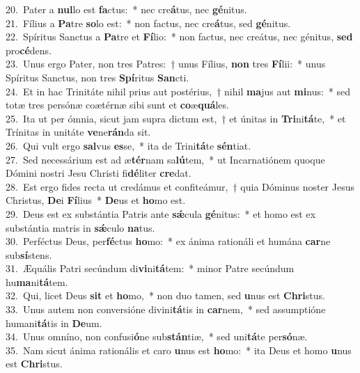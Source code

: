 {20.~}Pater a \textbf{nul}lo est \textbf{fa}ctus:~* nec cre\textbf{á}tus, nec \textbf{gé}nitus.\\
{21.~}Fílius a \textbf{Pa}tre \textbf{so}lo est:~* non factus, nec cre\textbf{á}tus, sed \textbf{gé}nitus.\\
{22.~}Spíritus Sanctus a \textbf{Pa}tre et \textbf{Fí}lio:~* non factus, nec creátus, nec génitus, \textbf{sed} pro\textbf{cé}dens.\\
{23.~}Unus ergo Pater, non tres Patres:~† unus Fílius, \textbf{non} tres \textbf{Fí}lii:~* unus Spíritus Sanctus, non tres \textbf{Spí}ritus \textbf{San}cti.\\
{24.~}Et in hac Trinitáte nihil prius aut postérius,~† nihil \textbf{ma}jus aut \textbf{mi}nus:~* sed totæ tres persónæ coætérnæ sibi sunt et \textbf{co}æ\textbf{quá}les.\\
{25.~}Ita ut per ómnia, sicut jam supra dictum est,~† et únitas in \textbf{Tri}ni\textbf{tá}te,~* et Trínitas in unitáte \textbf{ve}ne\textbf{rán}da sit.\\
{26.~}Qui vult ergo \textbf{sal}vus \textbf{es}se,~* ita de Trini\textbf{tá}te \textbf{sén}tiat.\\
{27.~}Sed necessárium est ad æ\textbf{tér}nam sa\textbf{lú}tem,~* ut Incarnatiónem quoque Dómini nostri Jesu Christi fi\textbf{dé}liter \textbf{cre}dat.\\
{28.~}Est ergo fides recta ut credámus et confiteámur,~† quia Dóminus noster Jesus Christus, \textbf{De}i \textbf{Fí}lius~* \textbf{De}us et \textbf{ho}mo est.\\
{29.~}Deus est ex substántia Patris ante \textbf{sǽ}cula \textbf{gé}nitus:~* et homo est ex substántia matris in \textbf{sǽ}culo \textbf{na}tus.\\
{30.~}Perféctus Deus, per\textbf{fé}ctus \textbf{ho}mo:~* ex ánima rationáli et humána \textbf{car}ne sub\textbf{sí}stens.\\
{31.~}Æquális Patri secúndum di\textbf{vi}ni\textbf{tá}tem:~* minor Patre secúndum hu\textbf{ma}ni\textbf{tá}tem.\\
{32.~}Qui, licet Deus \textbf{sit} et \textbf{ho}mo,~* non duo tamen, sed \textbf{u}nus est \textbf{Chri}stus.\\
{33.~}Unus autem non conversióne divini\textbf{tá}tis in \textbf{car}nem,~* sed assumptióne humani\textbf{tá}tis in \textbf{De}um.\\
{34.~}Unus omníno, non confusi\textbf{ó}ne sub\textbf{stán}tiæ,~* sed uni\textbf{tá}te per\textbf{só}næ.\\
{35.~}Nam sicut ánima rationális et caro \textbf{u}nus est \textbf{ho}mo:~* ita Deus et homo \textbf{u}nus est \textbf{Chri}stus.\\
